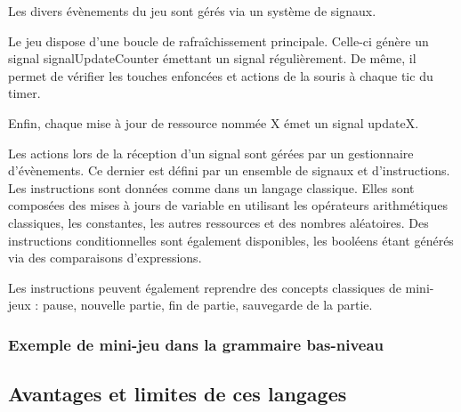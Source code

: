 Les divers évènements du jeu sont gérés via un système de signaux.

Le jeu dispose d'une boucle de rafraîchissement principale. Celle-ci génère un signal
signalUpdateCounter émettant un signal régulièrement.
De même, il permet de vérifier les touches enfoncées et actions de la souris à chaque tic du timer.

Enfin, chaque mise à jour de ressource nommée X émet un signal updateX.

Les actions lors de la réception d'un signal sont gérées par un gestionnaire d'évènements.
Ce dernier est défini par un ensemble de signaux et d'instructions.
Les instructions sont données comme dans un langage classique.
Elles sont composées des mises à jours de variable en utilisant les opérateurs arithmétiques classiques, les constantes, les autres ressources et des nombres
aléatoires.
Des instructions conditionnelles sont également disponibles, les booléens étant générés via des comparaisons d'expressions.

Les instructions peuvent également reprendre des concepts classiques de mini-jeux : pause, nouvelle partie, fin de partie, sauvegarde de la partie.

\subsubsection{Exemple de mini-jeu dans la grammaire bas-niveau}


\subsection{Avantages et limites de ces langages}